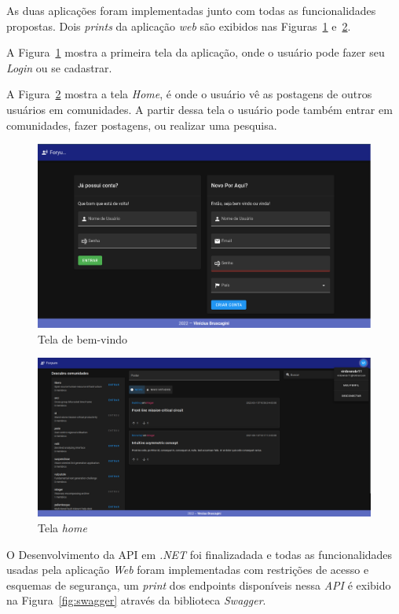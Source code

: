 \documentclass[12pt]{article}
\begin{document}
As duas aplicações foram implementadas junto com todas as funcionalidades propostas.
Dois \textit{prints} da aplicação \textit{web} são exibidos nas Figuras~\ref{fig:welcome} e~\ref{fig:home}.

A Figura~\ref{fig:welcome} mostra a primeira tela da aplicação, onde o usuário pode fazer seu \textit{Login} ou se cadastrar.

A Figura~\ref{fig:home} mostra a tela \textit{Home}, é onde o usuário vê as postagens de outros usuários em comunidades.
A partir dessa tela o usuário pode também entrar em comunidades, fazer postagens, ou realizar uma pesquisa.

\begin{figure}[H]
    \centering
    \includegraphics[width=1\textwidth]{prints/welcome.png}
    \caption{Tela de bem-vindo}\label{fig:welcome}
\end{figure}


\begin{figure}[H]
    \centering
    \includegraphics[width=1\textwidth]{prints/home.png}
    \caption{Tela \textit{home}}\label{fig:home}
\end{figure}

O Desenvolvimento da API em \textit{.NET} foi finalizadada e todas as funcionalidades
usadas pela aplicação \textit{Web} foram implementadas com restrições de acesso e esquemas de
segurança, um \textit{print} dos endpoints disponíveis nessa \textit{API} é exibido
na Figura~\ref{fig:swagger} através da biblioteca \textit{Swagger}.
\end{document}
